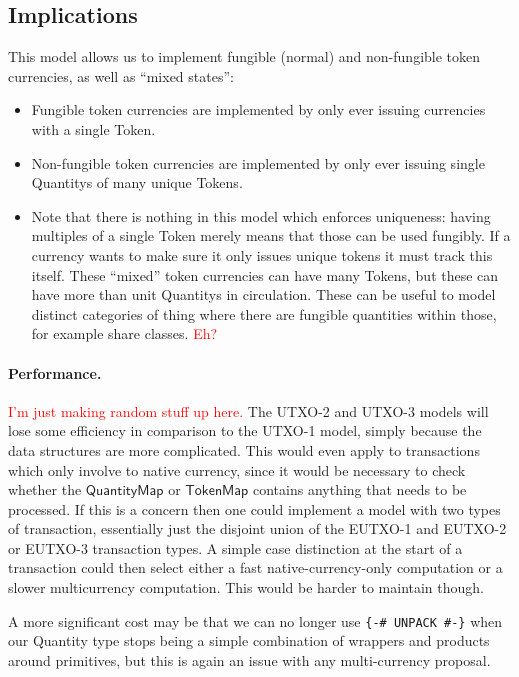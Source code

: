 \documentclass[a4paper]{article}
\newcommand{\red}[1]{\textcolor{red}{#1}}
\newcommand{\s}{\textsf}  %
\theoremstyle{definition}  %
\newcommand{\qtymap}{\ensuremath{\s{QuantityMap}}}
\newcommand{\tokenmap}{\ensuremath{\s{TokenMap}}}
\begin{document}
\subsection{Implications}
This model allows us to implement fungible (normal) and non-fungible
token currencies, as well as ``mixed states'':
\begin{itemize}
\item Fungible token currencies are implemented by only ever issuing
  currencies with a single \s{Token}.
\item Non-fungible token currencies are implemented by only ever
  issuing single \s{Quantity}s of many unique \s{Token}s.
\item Note that there is nothing in this model which enforces
  uniqueness: having multiples of a single \s{Token} merely means that
  those can be used fungibly. If a currency wants to make sure it only
  issues unique tokens it must track this itself.  These ``mixed'' token
  currencies can have many \s{Token}s, but these can have more than unit
  \s{Quantity}s in circulation.  These can be useful to model distinct
  categories of thing where there are fungible quantities within
  those, for example share classes. \red{Eh?}
\end{itemize}

\paragraph{Performance.}
\red{I'm just making random stuff up here.}
The UTXO-2 and UTXO-3 models will lose some efficiency in comparison
to the UTXO-1 model, simply because the data structures are more
complicated.  This would even apply to transactions which only involve
to native currency, since it would be necessary to check whether the
\qtymap{} or \tokenmap{} contains anything that needs to be processed.  If this is
a concern then one could implement a model with two types of
transaction, essentially just the disjoint union of the EUTXO-1 and
EUTXO-2 or EUTXO-3 transaction types. A simple case distinction at the
start of a transaction could then select either a fast
native-currency-only computation or a slower multicurrency computation.
This would be harder to maintain though.

\smallskip
A more significant cost may be that we can no longer use \verb|{-# UNPACK #-}|
when our Quantity type stops being a simple combination of wrappers
and products around primitives, but this is again an issue with any
multi-currency proposal.
\end{document}
